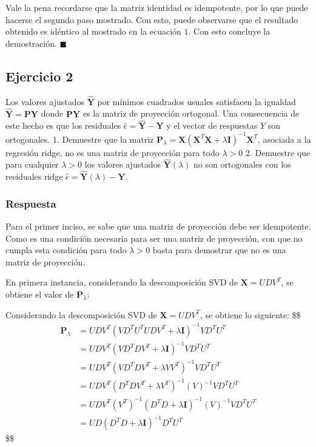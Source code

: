 \documentclass[11pt]{article}
\begin{document}
Vale la pena recordarse que la matriz identidad es idempotente, por lo
que puede hacerse el segundo paso mostrado. Con esto, puede observarse
que el resultado obtenido es idéntico al mostrado en la ecuación \(1\).
Con esto concluye la demostración. \(\blacksquare\)

    \hypertarget{ejercicio-2}{%
\subsection{Ejercicio 2}\label{ejercicio-2}}

Los valores ajustados \(\widehat{\mathbf{Y}}\) por mínimos cuadrados
usuales satisfacen la igualdad \(\widehat{\mathbf{Y}} = \mathbf{PY}\)
donde \(\mathbf{PY}\) es la matriz de proyección ortogonal. Una
consecuencia de este hecho es que los residuales
\(\widehat{\epsilon} =\widehat{\mathbf{Y}} - \mathbf{Y}\) y el vector de
respuestas \(Y\) son ortogonales. 1. Demuestre que la matriz
\(\mathbf{P}_\lambda = \mathbf{X}\left(\mathbf{X}^T\mathbf{X} + \lambda \mathbf{I}\right)^{-1}\mathbf{X}^T\),
asociada a la regresión ridge, no es una matriz de proyección para todo
\(\lambda > 0\) 2. Demuestre que para cualquier \(\lambda > 0\) los
valores ajustados \(\widehat{\mathbf{Y}}(\lambda)\) no son ortogonales
con los residuales ridge
\(\widehat{\epsilon} =\widehat{\mathbf{Y}}(\lambda) - \mathbf{Y}\).

    \hypertarget{respuesta}{%
\subsubsection{Respuesta}\label{respuesta}}

Para el primer inciso, se sabe que una matriz de proyección debe ser
idempotente. Como es una condición necesaria para ser una matriz de
proyección, con que no cumpla esta condición para todo \(\lambda>0\)
basta para demostrar que no es una matriz de proyección.

En primera instancia, considerando la descomposición SVD de
\(\mathbf{X} = UDV^T\), se obtiene el valor de \(\mathbf{P}_\lambda\):

Considerando la descomposición SVD de \(\mathbf{X} = UDV^T\), se obtiene
lo siguiente: \$\$\begin{align*}
\mathbf{P}_\lambda &= 
UDV^T\left(VD^TU^TUDV^T + \lambda \mathbf{I}\right)^{-1}VD^TU^T \\

&= 
UDV^T\left(VD^TDV^T + \lambda \mathbf{I}\right)^{-1}VD^TU^T\\

&= 
UDV^T\left(VD^TDV^T + \lambda VV^T\right)^{-1}VD^TU^T \\

&= 
UDV^T\left(D^TDV^T + \lambda V^T\right)^{-1}(V)^{-1}VD^TU^T \\

&=
UDV^T(V^T)^{-1}\left(D^TD + \lambda \mathbf{I}\right)^{-1}(V)^{-1}VD^TU^T \\ 

&=
UD\left(D^TD + \lambda \mathbf{I}\right)^{-1}D^TU^T\tag{4}
\end{align*}\$\$
\end{document}
